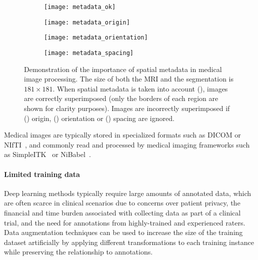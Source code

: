 \begin{figure}
  \centering

  \begin{subfigure}{0.24\textwidth}
    \texttt{[image: metadata\_ok]}
    \caption{}
    \label{fig:meta_ok}
  \end{subfigure}
  \hfill
  \begin{subfigure}{0.24\textwidth}
    \texttt{[image: metadata\_origin]}
    \caption{}
    \label{fig:meta_origin}
  \end{subfigure}
  \hfill
  \begin{subfigure}{0.24\textwidth}
    \texttt{[image: metadata\_orientation]}
    \caption{}
    \label{fig:meta_orientation}
  \end{subfigure}
  \hfill
  \begin{subfigure}{0.24\textwidth}
    \texttt{[image: metadata\_spacing]}
    \caption{}
    \label{fig:meta_spacing}
  \end{subfigure}

  \caption[Demonstration of the importance of spatial metadata in medical image processing]{
    Demonstration of the importance of spatial metadata in medical image processing.
    The size of both the \ac{MRI} and the segmentation is $181 \times 181$.
    When spatial metadata is taken into account (), images are correctly superimposed (only the borders of each region are shown for clarity purposes).
    Images are incorrectly superimposed if () origin, () orientation or () spacing are ignored.
  }
  \label{fig:metadata}
\end{figure}



Medical images are typically stored in specialized formats such as \ac{DICOM} or \ac{NIfTI}~\cite{larobina_medical_2014}, and commonly read and processed by medical imaging frameworks
such as SimpleITK~\cite{lowekamp_design_2013} or NiBabel~\cite{brett_nipynibabel_2020}.


\paragraph{Limited training data}

Deep learning methods typically require large amounts of annotated data, which are often scarce in clinical scenarios due to concerns over patient privacy, the financial and time burden associated with collecting data as part of a clinical trial, and the need for annotations from highly-trained and experienced raters.
Data augmentation techniques can be used to increase the size of the training dataset artificially by applying different transformations to each training instance while preserving the relationship to annotations.

